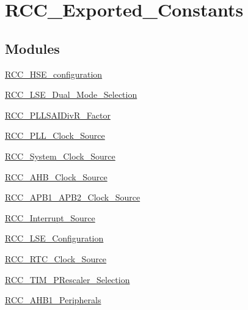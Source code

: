 \hypertarget{group___r_c_c___exported___constants}{}\section{R\+C\+C\+\_\+\+Exported\+\_\+\+Constants}
\label{group___r_c_c___exported___constants}
\subsection*{Modules}
\begin{DoxyCompactItemize}
\item 
\mbox{\hyperlink{group___r_c_c___h_s_e__configuration}{R\+C\+C\+\_\+\+H\+S\+E\+\_\+configuration}}
\item 
\mbox{\hyperlink{group___r_c_c___l_s_e___dual___mode___selection}{R\+C\+C\+\_\+\+L\+S\+E\+\_\+\+Dual\+\_\+\+Mode\+\_\+\+Selection}}
\item 
\mbox{\hyperlink{group___r_c_c___p_l_l_s_a_i_div_r___factor}{R\+C\+C\+\_\+\+P\+L\+L\+S\+A\+I\+Div\+R\+\_\+\+Factor}}
\item 
\mbox{\hyperlink{group___r_c_c___p_l_l___clock___source}{R\+C\+C\+\_\+\+P\+L\+L\+\_\+\+Clock\+\_\+\+Source}}
\item 
\mbox{\hyperlink{group___r_c_c___system___clock___source}{R\+C\+C\+\_\+\+System\+\_\+\+Clock\+\_\+\+Source}}
\item 
\mbox{\hyperlink{group___r_c_c___a_h_b___clock___source}{R\+C\+C\+\_\+\+A\+H\+B\+\_\+\+Clock\+\_\+\+Source}}
\item 
\mbox{\hyperlink{group___r_c_c___a_p_b1___a_p_b2___clock___source}{R\+C\+C\+\_\+\+A\+P\+B1\+\_\+\+A\+P\+B2\+\_\+\+Clock\+\_\+\+Source}}
\item 
\mbox{\hyperlink{group___r_c_c___interrupt___source}{R\+C\+C\+\_\+\+Interrupt\+\_\+\+Source}}
\item 
\mbox{\hyperlink{group___r_c_c___l_s_e___configuration}{R\+C\+C\+\_\+\+L\+S\+E\+\_\+\+Configuration}}
\item 
\mbox{\hyperlink{group___r_c_c___r_t_c___clock___source}{R\+C\+C\+\_\+\+R\+T\+C\+\_\+\+Clock\+\_\+\+Source}}
\item 
\mbox{\hyperlink{group___r_c_c___t_i_m___p_rescaler___selection}{R\+C\+C\+\_\+\+T\+I\+M\+\_\+\+P\+Rescaler\+\_\+\+Selection}}
\item 
\mbox{\hyperlink{group___r_c_c___a_h_b1___peripherals}{R\+C\+C\+\_\+\+A\+H\+B1\+\_\+\+Peripherals}}
\item 

\end{DoxyCompactItemize}
